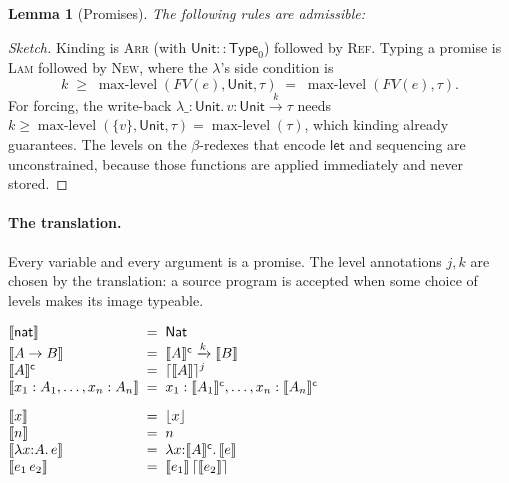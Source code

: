\documentclass[11pt]{article}
\newtheorem*{lemma}{Lemma}
\newcommand{\Nat}{\mathsf{Nat}}
\newcommand{\Unit}{\mathsf{Unit}}
\newcommand{\Type}[1]{\mathsf{Type}_{#1}}
\newcommand{\arr}[1]{\xrightarrow{#1}}
\newcommand{\lam}[2]{\lambda #1{:}#2.\,}
\newcommand{\maxlevel}{\operatorname{max-level}}
\newcommand{\FV}{\mathit{FV}}
\newcommand{\Prom}[2]{\lceil #2 \rceil^{#1}}
\newcommand{\prom}[1]{\lceil #1 \rceil}
\newcommand{\frc}[1]{\lfloor #1 \rfloor}
\newcommand{\snat}{\mathsf{nat}}
\newcommand{\slam}[1]{\lambda #1.\,}
\newcommand{\tr}[1]{\llbracket #1 \rrbracket}
\newcommand{\trc}[1]{\llbracket #1 \rrbracket^{\mathsf{c}}}
\newcommand{\rn}[1]{\textsc{#1}}
\begin{document}
\begin{lemma}[Promises]
  The following rules are admissible:
\end{lemma}
\begin{proof}[Sketch]
  Kinding is \rn{Arr} (with $\Unit :: \Type{0}$) followed by \rn{Ref}. Typing a
  promise is \rn{Lam} followed by \rn{New}, where the $\lambda$'s side
  condition is
  \[
    k \;\geq\; \maxlevel(\FV(e), \Unit, \tau) \;=\; \maxlevel(\FV(e), \tau).
  \]
  For forcing, the write-back $\lam{\_}{\Unit} v : \Unit \arr{k} \tau$ needs
  $k \geq \maxlevel(\{v\}, \Unit, \tau) = \maxlevel(\tau)$, which kinding
  already guarantees. The levels on the $\beta$-redexes that encode
  $\mathsf{let}$ and sequencing are unconstrained, because those functions are
  applied immediately and never stored.
\end{proof}

\paragraph{The translation.}
Every variable and every argument is a promise. The level annotations $j, k$
are chosen by the translation: a source program is accepted when some choice
of levels makes its image typeable.

\medskip
\noindent\quad
$\begin{array}{@{}l@{\;\;=\;\;}l@{}}
  \tr{\snat} & \Nat \\
  \tr{A \to B} & \trc{A} \arr{k} \tr{B} \\
  \trc{A} & \Prom{j}{\tr{A}} \\
  \tr{x_1 : A_1, \ldots, x_n : A_n} & x_1 : \trc{A_1}, \ldots, x_n : \trc{A_n} \\[2ex]
  \tr{x} & \frc{x} \\
  \tr{n} & n \\
  \tr{\slam{x{:}A} e} & \lam{x}{\trc{A}} \tr{e} \\
  \tr{e_1\,e_2} & \tr{e_1}\,\prom{\tr{e_2}}
\end{array}$
\medskip
\end{document}
